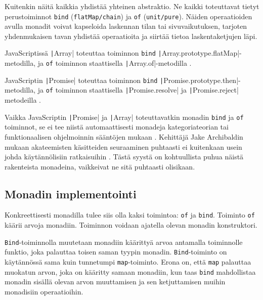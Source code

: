 Kuitenkin näitä kaikkia yhdistää yhteinen abstraktio. Ne kaikki toteuttavat tietyt perustoiminnot \texttt{bind} (\texttt{flatMap/chain}) ja \texttt{of} (\texttt{unit/pure}). Näiden operaatioiden avulla monadit voivat kapseloida laskennan tilan tai sivuvaikutuksen, tarjoten yhdenmukaisen tavan yhdistää operaatioita ja siirtää tietoa laskentaketjujen läpi.

JavaScriptissä \texttt|Array| toteuttaa toiminnon \texttt{bind} \texttt|Array.prototype.flatMap|-metodilla, ja \texttt{of} toiminnon staattisella \texttt|Array.of|-metodilla \cite{stackoverflow_flatmap_monad,stackoverflow_js_array_monad}.


JavaScriptin \texttt|Promise| toteuttaa toiminnon \texttt{bind} \texttt|Promise.prototype.then|-metodilla, ja \texttt{of} toiminnon staattisella \texttt|Promise.resolve| ja \texttt|Promise.reject| metodeilla \cite{read-it-later-11481,stackoverflow:why_monad,promises-spec-94}.

Vaikka JavaScriptin \texttt|Promise| ja \texttt|Array| toteuttavatkin monadin \texttt{bind} ja \texttt{of} toiminnot, se ei tee niistä automaattisesti monadeja kategoriateorian tai funktionaalisen ohjelmoinnin sääntöjen mukaan \cite{promises-spec-94,stackoverflow:why_monad,stackoverflow_js_array_monad}. Kehittäjä Jake Archibaldin mukaan akateemisten käsitteiden seuraaminen puhtaasti ei kuitenkaan usein johda käytännölisiin ratkaisuihin \cite{pennane_fp_gist}. Tästä syystä on kohtuullista puhua näistä rakenteista monadeina, vaikkeivat ne sitä puhtaasti olisikaan.


\subsection{Monadin implementointi}

Konkreettisesti monadilla tulee siis olla kaksi toimintoa: \texttt{of} ja \texttt{bind}. Toiminto \texttt{of} käärii arvoja monadiin. Toiminnon voidaan ajatella olevan monadin konstruktori. \citep{stackoverflow_what_monad}

\texttt{Bind}-toiminnolla muutetaan monadiin käärittyä arvoa antamalla toiminnolle funktio, joka palauttaa toisen saman tyypin monadin. \cite{stackoverflow_what_monad} \texttt{Bind}-toiminto on käytännössä sama kuin tunnetumpi \texttt{map}-toiminto. Erona on, että \texttt{map} palauttaa muokatun arvon, joka on kääritty samaan monadiin, kun taas \texttt{bind} mahdollistaa monadin sisällä olevan arvon muuttamisen ja sen ketjuttamisen muihin monadisiin operaatioihin.

